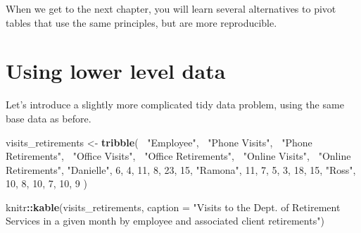 \documentclass[]{book}
\newenvironment{Shaded}{\begin{snugshade}}{\end{snugshade}}
\newcommand{\DataTypeTok}[1]{\textcolor[rgb]{0.13,0.29,0.53}{#1}}
\newcommand{\DecValTok}[1]{\textcolor[rgb]{0.00,0.00,0.81}{#1}}
\newcommand{\KeywordTok}[1]{\textcolor[rgb]{0.13,0.29,0.53}{\textbf{#1}}}
\newcommand{\NormalTok}[1]{#1}
\newcommand{\OperatorTok}[1]{\textcolor[rgb]{0.81,0.36,0.00}{\textbf{#1}}}
\newcommand{\StringTok}[1]{\textcolor[rgb]{0.31,0.60,0.02}{#1}}
\begin{document}
\begin{Shaded}
\end{Shaded}

\hypertarget{htmlwidget-f9ede8aa2f1999320b0a}{}

When we get to the next chapter, you will learn several alternatives to pivot tables that use the same principles, but are more reproducible.

\hypertarget{using-lower-level-data}{%
\section{Using lower level data}\label{using-lower-level-data}}

Let's introduce a slightly more complicated tidy data problem, using the same base data as before.

\begin{Shaded}
\begin{Highlighting}[]
\NormalTok{visits_retirements <-}\StringTok{ }\KeywordTok{tribble}\NormalTok{(}
  \OperatorTok{~}\StringTok{"Employee"}\NormalTok{, }\OperatorTok{~}\StringTok{"Phone Visits"}\NormalTok{, }\OperatorTok{~}\StringTok{"Phone Retirements"}\NormalTok{, }\OperatorTok{~}\StringTok{"Office Visits"}\NormalTok{, }\OperatorTok{~}\StringTok{"Office Retirements"}\NormalTok{, }\OperatorTok{~}\StringTok{"Online Visits"}\NormalTok{, }\OperatorTok{~}\StringTok{"Online Retirements"}\NormalTok{,}
  \StringTok{"Danielle"}\NormalTok{, }\DecValTok{6}\NormalTok{, }\DecValTok{4}\NormalTok{, }\DecValTok{11}\NormalTok{, }\DecValTok{8}\NormalTok{, }\DecValTok{23}\NormalTok{, }\DecValTok{15}\NormalTok{,}
  \StringTok{"Ramona"}\NormalTok{, }\DecValTok{11}\NormalTok{, }\DecValTok{7}\NormalTok{, }\DecValTok{5}\NormalTok{, }\DecValTok{3}\NormalTok{, }\DecValTok{18}\NormalTok{, }\DecValTok{15}\NormalTok{,}
  \StringTok{"Ross"}\NormalTok{, }\DecValTok{10}\NormalTok{, }\DecValTok{8}\NormalTok{, }\DecValTok{10}\NormalTok{, }\DecValTok{7}\NormalTok{, }\DecValTok{10}\NormalTok{, }\DecValTok{9} 
\NormalTok{)}

\NormalTok{knitr}\OperatorTok{::}\KeywordTok{kable}\NormalTok{(visits_retirements, }\DataTypeTok{caption =} \StringTok{"Visits to the Dept. of Retirement Services in a given month by employee and associated client retirements"}\NormalTok{)}
\end{Highlighting}
\end{Shaded}
\end{document}
